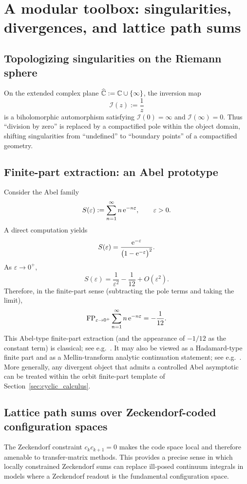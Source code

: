 \section{A modular toolbox: singularities, divergences, and lattice path sums}
\label{sec:modules}

\subsection{Topologizing singularities on the Riemann sphere}
On the extended complex plane $\widehat{\mathbb{C}}:=\mathbb{C}\cup\{\infty\}$, the inversion map
$$
\mathcal{I}(z):=\frac{1}{z}
$$
is a biholomorphic automorphism satisfying $\mathcal{I}(0)=\infty$ and $\mathcal{I}(\infty)=0$. Thus ``division by zero'' is replaced by a compactified pole within the object domain, shifting singularities from ``undefined'' to ``boundary points'' of a compactified geometry.

\subsection{Finite-part extraction: an Abel prototype}
Consider the Abel family
$$
S(\varepsilon):=\sum_{n=1}^{\infty} n\,\mathrm{e}^{-n\varepsilon},\qquad \varepsilon>0.
$$
A direct computation yields
$$
S(\varepsilon)=\frac{\mathrm{e}^{-\varepsilon}}{\bigl(1-\mathrm{e}^{-\varepsilon}\bigr)^2}.
$$
As $\varepsilon\to 0^+$,
$$
S(\varepsilon)=\frac{1}{\varepsilon^2}-\frac{1}{12}+O(\varepsilon^2).
$$
Therefore, in the finite-part sense (subtracting the pole terms and taking the limit),
$$
\mathrm{FP}_{\varepsilon\to 0^+} \sum_{n=1}^{\infty} n\,\mathrm{e}^{-n\varepsilon}=-\frac{1}{12}.
$$
This Abel-type finite-part extraction (and the appearance of $-1/12$ as the constant term) is classical; see e.g.~\cite{Hardy1949}.
It may also be viewed as a Hadamard-type finite part and as a Mellin-transform analytic continuation statement; see e.g.~\cite{EstradaKanwal2002,FlajoletGourdonDumas1995}.
More generally, any divergent object that admits a controlled Abel asymptotic can be treated within the orbit finite-part template of Section~\ref{sec:cyclic_calculus}.

\subsection{Lattice path sums over Zeckendorf-coded configuration spaces}
The Zeckendorf constraint $c_kc_{k+1}=0$ makes the code space local and therefore amenable to transfer-matrix methods.
This provides a precise sense in which locally constrained Zeckendorf sums can replace ill-posed continuum integrals in models where a Zeckendorf readout is the fundamental configuration space.

